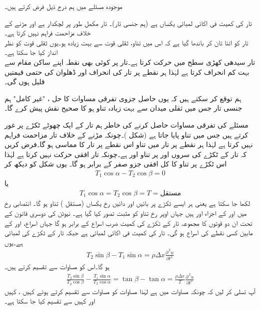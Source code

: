 موجودہ مسئلے میں ہم درج ذیل فرض کرتے ہیں۔

 \quad تار کی کمیت فی اکائی لمبائی یکساں ہے (ہم جنسی تار)۔ تار مکمل طور پر لچکدار ہے اور مڑنے کے خلاف مزاحمت فراہم نہیں کرتا ہے۔ \\
 \quad تار کو اتنا تان کر باندھا گیا ہے کہ اس میں تناو، ثقلی قوت سے بہت زیادہ ہو۔یوں ثقلی قوت کو نظر انداز کیا جا سکتا ہے۔\\
 \quad تار سیدھی کھڑی سطح میں حرکت کرتا ہے۔تار پر کوئی بھی نقطہ اپنے ساکن مقام سے بہت کم انحراف کرتا ہے لہٰذا ہر نقطے پر تار کی انحراف اور ڈھلوان کی حتمی قیمتیں قلیل ہوں گی۔ 


ہم توقع کر سکتے ہیں کہ یوں حاصل جزوی تفرقی مساوات کا حل ،  "غیر کامل"  ہم جنسی تار جس میں ثقلی میدان سے بہت زیادہ تناو ہو  کا صحیح نقش پیش کرے گا۔  

مسئلے کی تفرقی مساوات حاصل کرنے کی خاطر ہم تار کے ایک چھوٹے ٹکڑے پر غور کرتے ہیں جس میں تناو  پایا جاتا ہے (شکل )۔چونکہ مڑنے کے خلاف تار مزاحمت فراہم نہیں کرتا ہے لہٰذا ہر نقطے پر تار میں تناو اس نقطے پر تار کا مماسی ہو گا۔فرض کریں کہ تار کے ٹکڑے  کی سروں  اور   پر تناو  اور  ہے۔چونکہ تار افقی حرکت نہیں کرتا ہے لہٰذا اس ٹکڑے پر تناو کا کل افقی جزو صفر کے برابر ہو گا۔ یوں شکل  کو دیکھ کر 
\begin{align*}
T_1\cos \alpha-T_2\cos \beta=0
\end{align*}
یا
\begin{align}\label{مساوات_جزوی_تار_الف}
T_1\cos \alpha=T_2\cos \beta=T=\text{مستقل}
\end{align}
لکھا جا سکتا ہے  یعنی ہر ایسے ٹکڑے پر بائیں اور دائیں رخ یکساں (مستقل ) تناو ہو گا۔ انتصابی رخ میں  اور  کے اجزاء  اور  ہیں جہاں اوپر رخ تناو کو مثبت تصور کیا گیا ہے۔ نیوٹن کی دوسری قانون کے تحت ان دو قوتوں کا مجموعہ تار کے ٹکڑے کی کمیت  ضرب  اسراع  کے برابر ہو گا جہاں اسراع،   اور  کے مابین کسی نقطے  کی اسراع ہو گی۔ تار کی کمیت فی اکائی لمبائی  ہے جبکہ تار کے ٹکڑے کی لمبائی  ہے۔یوں
\begin{align}\label{مساوات_جزوی_تار_ب}
T_2\sin \beta-T_1\sin \alpha=\rho\Delta x\frac{\partial^{\,2}u}{\partial t^2}
\end{align} 
ہو گا۔اس کو مساوات  سے تقسیم کرتے ہیں۔
\begin{align}\label{مساوات_جزوی_تار_پ}
\frac{T_2\sin \beta}{T_2\cos \beta}-\frac{T_1\sin \alpha}{T_2\cos \alpha}=\tan \beta -\tan \alpha=\frac{\rho \Delta x}{T}\frac{\partial^{\,2}u}{\partial t^2}
\end{align}
آپ تسلی کر لیں کہ چونکہ مساوات  میں  ہے لہٰذا مساوات  کو مساوات  سے تقسیم کرتے ہوئے کہیں ، کہیں  اور کہیں  سے تقسیم کیا جا سکتا ہے۔ 

